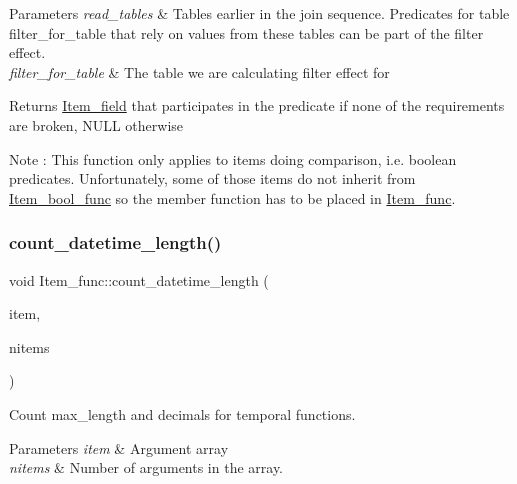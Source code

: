 \begin{DoxyParams}{Parameters}
{\em read\+\_\+tables} & Tables earlier in the join sequence. Predicates for table \textquotesingle{}filter\+\_\+for\+\_\+table\textquotesingle{} that rely on values from these tables can be part of the filter effect. \\
\hline
{\em filter\+\_\+for\+\_\+table} & The table we are calculating filter effect for\\
\hline
\end{DoxyParams}
\begin{DoxyReturn}{Returns}
\mbox{\hyperlink{classItem__field}{Item\+\_\+field}} that participates in the predicate if none of the requirements are broken, N\+U\+LL otherwise
\end{DoxyReturn}
\begin{DoxyNote}{Note}
\+: This function only applies to items doing comparison, i.\+e. boolean predicates. Unfortunately, some of those items do not inherit from \mbox{\hyperlink{classItem__bool__func}{Item\+\_\+bool\+\_\+func}} so the member function has to be placed in \mbox{\hyperlink{classItem__func}{Item\+\_\+func}}. 
\end{DoxyNote}
\mbox{\label{classItem__func_a3380dac8e8c760d72db5efeaa1c59d58}} 
\subsubsection{\texorpdfstring{count\+\_\+datetime\+\_\+length()}{count\_datetime\_length()}}
{\footnotesize\ttfamily void Item\+\_\+func\+::count\+\_\+datetime\+\_\+length (\begin{DoxyParamCaption}\item[{\mbox{\hyperlink{classItem}{Item}} $\ast$$\ast$}]{item,  }\item[{uint}]{nitems }\end{DoxyParamCaption})}

Count max\+\_\+length and decimals for temporal functions.


\begin{DoxyParams}{Parameters}
{\em item} & Argument array \\
\hline
{\em nitems} & Number of arguments in the array.\\
\hline
\end{DoxyParams}

